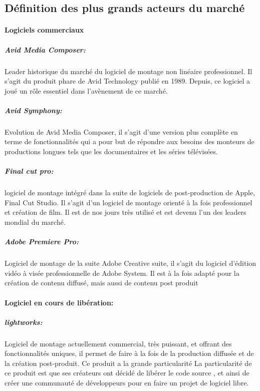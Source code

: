 \subsection{Définition des plus grands acteurs du marché}

\paragraph {Logiciels commerciaux}

\subparagraph{Avid Media Composer:}

Leader historique du marché du logiciel de montage non linéaire
professionnel. Il s'agit du produit phare de Avid Technology publié en 1989. Depuis, ce
logiciel a joué un rôle essentiel dans l'avènement de ce marché.

\subparagraph{Avid Symphony:}

Evolution de Avid Media Composer, il s'agit d'une version plus complète en terme
de fonctionnalités qui a pour but de répondre aux besoins des monteurs de productions longues tels que
les documentaires et les séries télévisées.

\subparagraph{Final cut pro:}

logiciel de montage intégré dans la suite de logiciels de post-production
de Apple, Final Cut Studio. Il s'agit d'un logiciel de montage orienté à la fois
professionnel et création de film. Il est de nos jours très utilisé et est devenu l'un
des leaders mondial du marché.

\subparagraph{Adobe Premiere Pro:}

Logiciel de montage de la suite Adobe Creative suite, il s'agit du logiciel
d'édition vidéo à visée professionnelle de Adobe System. Il est à la fois adapté pour la création
de contenu diffusé, mais aussi de contenu post produit

\paragraph {Logiciel en cours de libération:}

\subparagraph{lightworks:}

Logiciel de montage actuellement commercial, très puissant, et offrant des fonctionnalités uniques,
il permet de faire à la fois de la production diffusée et de la création post-produit. Ce produit
a la grande particularité La particularité de ce produit est que ses créateurs ont décidé de libérer le code source
\cite{TheLightworksOpenSourceProjectStartHere}, et ainsi  de créer une communauté de développeurs pour
en faire un projet de logiciel libre.

